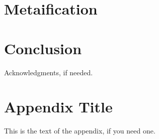 \documentclass{sigplanconf}
\begin{document}
\section{Metaification}

\section{Conclusion}



\acks

Acknowledgments, if needed.





\appendix
\section{Appendix Title}

This is the text of the appendix, if you need one.
\end{document}
